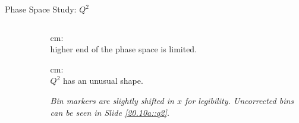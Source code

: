 \begin{frame}{Phase Space Study: $Q^2$}
    \label{12.12::q2}

    \begin{columns}[onlytextwidth,T]

    \begin{column}{.80\linewidth}
        \vspace{-15pt}
        \begin{center}
            \begin{figure}[t]
            \end{figure}
        \end{center}
    \end{column}

    \begin{column}{.18\linewidth}
        \small{ \textcolor{efd_green}{cm}: \\ higher end of the phase space is limited.}

        \vspace{12pt}

        \small{ \textcolor{efd_green}{cm}: \\ $Q^2$ has an unusual shape.}

        \vspace{12pt}

        \small{}

        \vspace{15pt}

        \begin{flushright}
            \tiny{\textit{
                Bin markers are slightly shifted in $x$ for legibility.
                Uncorrected bins can be seen in Slide \textcolor{efd_purple}{\ref{20.10a::q2}}.
            }}
        \end{flushright}
    \end{column}

    \end{columns}
\end{frame}

